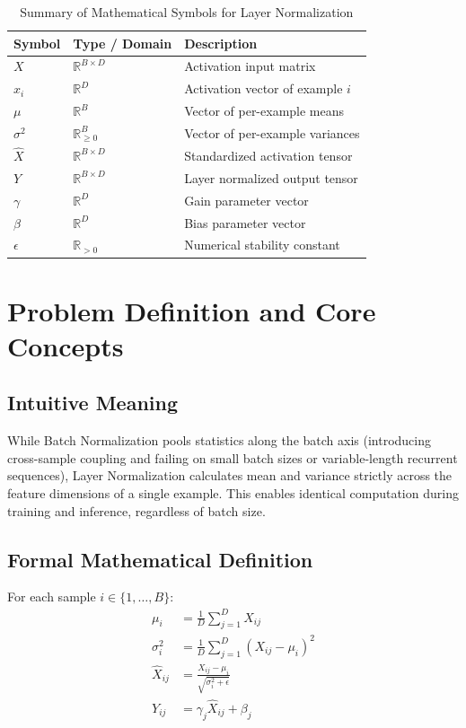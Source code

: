 \documentclass[11pt,a4paper]{article}
\theoremstyle{definition}
\begin{document}
\begin{table}[h]
\centering
\caption{Summary of Mathematical Symbols for Layer Normalization}
\begin{tabular}{lll}
\toprule
\textbf{Symbol} & \textbf{Type / Domain} & \textbf{Description} \\
\midrule
$X$ & $\mathbb{R}^{B \times D}$ & Activation input matrix \\
$x_i$ & $\mathbb{R}^D$ & Activation vector of example $i$ \\
$\mu$ & $\mathbb{R}^B$ & Vector of per-example means \\
$\sigma^2$ & $\mathbb{R}_{\ge 0}^B$ & Vector of per-example variances \\
$\hat{X}$ & $\mathbb{R}^{B \times D}$ & Standardized activation tensor \\
$Y$ & $\mathbb{R}^{B \times D}$ & Layer normalized output tensor \\
$\gamma$ & $\mathbb{R}^D$ & Gain parameter vector \\
$\beta$ & $\mathbb{R}^D$ & Bias parameter vector \\
$\epsilon$ & $\mathbb{R}_{> 0}$ & Numerical stability constant \\
\bottomrule
\end{tabular}
\end{table}

\section{Problem Definition and Core Concepts}

\subsection{Intuitive Meaning}
While Batch Normalization pools statistics along the batch axis (introducing cross-sample coupling and failing on small batch sizes or variable-length recurrent sequences), Layer Normalization calculates mean and variance strictly across the feature dimensions of a single example. This enables identical computation during training and inference, regardless of batch size.

\subsection{Formal Mathematical Definition}
For each sample $i \in \{1, \dots, B\}$:
\begin{align}
\mu_i &= \frac{1}{D} \sum_{j=1}^D X_{ij} \\
\sigma_i^2 &= \frac{1}{D} \sum_{j=1}^D (X_{ij} - \mu_i)^2 \\
\hat{X}_{ij} &= \frac{X_{ij} - \mu_i}{\sqrt{\sigma_i^2 + \epsilon}} \\
Y_{ij} &= \gamma_j \hat{X}_{ij} + \beta_j
\end{align}
\end{document}
